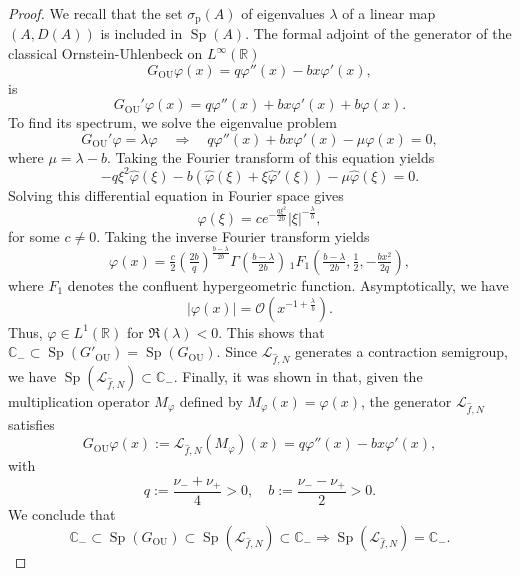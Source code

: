 \documentclass[11pt]{amsart}
\newcommand{\1}{\mathbbm{1}}
\theoremstyle{plain}
\theoremstyle{definition}
\theoremstyle{remark}
\numberwithin{equation}{section}
\begin{document}
\begin{proof}
We recall that the set $\sigma_{\mathrm{p}}(A)$ of eigenvalues $\lambda$ of a linear map $(A,D(A))$ is included in $\operatorname{Sp}(A)$. The formal adjoint of the generator of the classical Ornstein-Uhlenbeck on $L^\infty(\mathbb{R})$ 
\[
G_{\mathrm{OU}} \varphi(x) = q \varphi''(x) - b x \varphi'(x),
\]
 is
\[
G_{\mathrm{OU}}' \varphi(x) = q \varphi''(x) + b x \varphi'(x) + b\varphi(x).
\]
To find its spectrum, we solve the eigenvalue problem
\[
G_{\mathrm{OU}}' \varphi = \lambda \varphi \quad \Rightarrow \quad q \varphi''(x) + b x \varphi'(x) - \mu \varphi(x) = 0,
\]
where \( \mu = \lambda - b \). 
Taking the Fourier transform of this equation yields
\[
- q \xi^2 \widehat{\varphi}(\xi) - b\left( \widehat{\varphi}(\xi) + \xi \widehat{\varphi}'(\xi) \right) - \mu \widehat{\varphi}(\xi) = 0.
\]
Solving this differential equation in Fourier space gives
\[
\widehat{\varphi}(\xi) = c e^{ -\frac{q \xi^2}{2b} } |\xi|^{ -\frac{\lambda}{b} },
\]
for some \( c \neq 0 \). Taking the inverse Fourier transform yields
\[
\varphi(x) = \tfrac{c}{2} \left( \tfrac{2b}{q} \right)^{\frac{b-\lambda}{2b}} \Gamma\left( \tfrac{b-\lambda}{2b}\right) \, {}_1F_1\left( \tfrac{b-\lambda}{2b}, \tfrac{1}{2}, -\tfrac{b x^2}{2q} \right),
\]
where $F_1$ denotes the confluent hypergeometric function. Asymptotically, we have
\[ \vert \varphi(x)\vert = \mathcal O(x^{-1+\frac{\lambda}{b}}).\]
 Thus, $\varphi \in L^1(\mathbb R)$ for $\Re(\lambda)<0$. This shows that $\mathbb C_- \subset \operatorname{Sp}(G'_{\operatorname{OU}})= \operatorname{Sp}(G_{\operatorname{OU}})$. Since $\mathcal L_{\widehat{f},N}$ generates a contraction semigroup, we have $\operatorname{Sp}(\mathcal L_{\widehat{f},N}) \subset \mathbb C_-.$ 
Finally, it was shown in \cite{OU} that, given the multiplication operator \( M_\varphi \) defined by \( M_\varphi(x) = \varphi(x) \),
 the generator $\mathcal{L}_{\widehat{f},N}$ satisfies
\[
G_{\mathrm{OU}} \varphi(x) := \mathcal{L}_{\widehat{f},N}(M_\varphi)(x) = q \varphi''(x) - b x \varphi'(x),
\]
with
\[
q := \frac{\nu_- + \nu_+}{4} > 0, \quad b := \frac{\nu_- - \nu_+}{2} > 0.
\]
  We conclude that
 \[ \mathbb C_- \subset \operatorname{Sp}(G_{\operatorname{OU}}) \subset \operatorname{Sp}(\mathcal L_{\widehat{f},N}) \subset \mathbb C_- \Longrightarrow \operatorname{Sp}(\mathcal L_{\widehat{f},N})=\mathbb C_-. \]
 
\end{proof}
\end{document}
